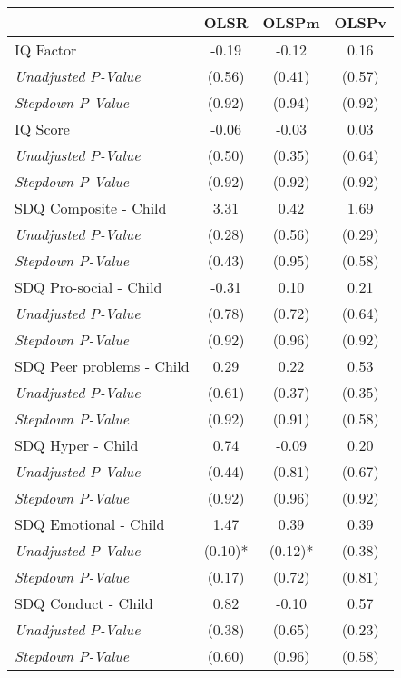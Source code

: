 \begin{tabular}{l c c c}
\toprule
 & OLSR & OLSPm & OLSPv \\
\midrule
IQ Factor & -0.19 & -0.12 & 0.16 \\
\quad \textit{Unadjusted P-Value} & (0.56) & (0.41) & (0.57) \\
\quad \textit{Stepdown P-Value} & (0.92) & (0.94) & (0.92) \\
IQ Score & -0.06 & -0.03 & 0.03 \\
\quad \textit{Unadjusted P-Value} & (0.50) & (0.35) & (0.64) \\
\quad \textit{Stepdown P-Value} & (0.92) & (0.92) & (0.92) \\
SDQ Composite - Child & 3.31 & 0.42 & 1.69 \\
\quad \textit{Unadjusted P-Value} & (0.28) & (0.56) & (0.29) \\
\quad \textit{Stepdown P-Value} & (0.43) & (0.95) & (0.58) \\
SDQ Pro-social - Child & -0.31 & 0.10 & 0.21 \\
\quad \textit{Unadjusted P-Value} & (0.78) & (0.72) & (0.64) \\
\quad \textit{Stepdown P-Value} & (0.92) & (0.96) & (0.92) \\
SDQ Peer problems - Child & 0.29 & 0.22 & 0.53 \\
\quad \textit{Unadjusted P-Value} & (0.61) & (0.37) & (0.35) \\
\quad \textit{Stepdown P-Value} & (0.92) & (0.91) & (0.58) \\
SDQ Hyper - Child & 0.74 & -0.09 & 0.20 \\
\quad \textit{Unadjusted P-Value} & (0.44) & (0.81) & (0.67) \\
\quad \textit{Stepdown P-Value} & (0.92) & (0.96) & (0.92) \\
SDQ Emotional - Child & 1.47 & 0.39 & 0.39 \\
\quad \textit{Unadjusted P-Value} & (0.10)* & (0.12)* & (0.38) \\
\quad \textit{Stepdown P-Value} & (0.17) & (0.72) & (0.81) \\
SDQ Conduct - Child & 0.82 & -0.10 & 0.57 \\
\quad \textit{Unadjusted P-Value} & (0.38) & (0.65) & (0.23) \\
\quad \textit{Stepdown P-Value} & (0.60) & (0.96) & (0.58) \\
\bottomrule
\end{tabular}
